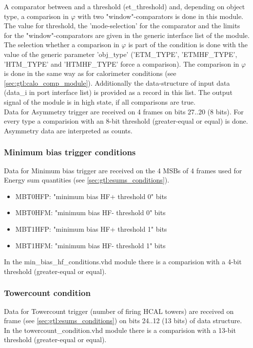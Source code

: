 A comparator between \et and a threshold (et\_threshold) and, depending on object type, a comparison in $\varphi$ with 
two "window"-comparators is done in this module. 
The value for \et threshold, the 'mode-selection' for the \et comparator and the limits for the "window"-comparators are given in the generic interface list of the module.
The selection whether a comparison in $\varphi$ is part of the condition is done with the value of the generic parameter 'obj\_type' 
('ETM\_TYPE', 'ETMHF\_TYPE', 'HTM\_TYPE' and 'HTMHF\_TYPE' force a comparison).
The comparison in $\varphi$ is done in the same way as for calorimeter conditions (see \ref{sec:gtl:calo_comp_module}).
Additionally the data-structure of input data (data\_i in port interface list) is provided
as a record in this list. The output signal of the module is in high state, if all comparisons are true.\\
Data for Asymmetry trigger are received on 4 frames on bits 27..20 (8 bits). For every type a comparision with an 8-bit threshold (greater-equal or equal) is done.
Asymmetry data are interpreted as counts.

\subsubsection{Minimum bias trigger conditions}
\label{sec:gtl:min_bias_conditions}

Data for Minimum bias trigger are received on the 4 MSBs of 4 frames used for Energy sum quantities (see \ref{sec:gtl:esums_conditions}). 

\begin{itemize}
\item MBT0HFP: "minimum bias HF+ threshold 0" bits
\item MBT0HFM: "minimum bias HF- threshold 0" bits
\item MBT1HFP: "minimum bias HF+ threshold 1" bits
\item MBT1HFM: "minimum bias HF- threshold 1" bits
\end{itemize}

In the min\_bias\_hf\_conditions.vhd module there is a comparision with a 4-bit threshold (greater-equal or equal).

\subsubsection{Towercount condition}
\label{sec:gtl:towercount_cond}

Data for Towercount trigger (number of firing HCAL towers) are received on frame \htt (see \ref{sec:gtl:esums_conditions}) on bits 24..12 (13 bits) of \htt data structure. 
In the towercount\_condition.vhd module there is a comparision with a 13-bit threshold (greater-equal or equal).

